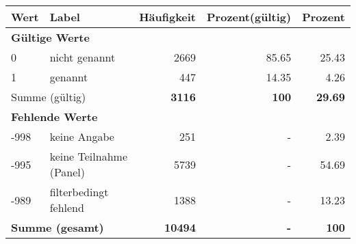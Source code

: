      \begin{longtable}{lXrrr}
     \toprule
     \textbf{Wert} & \textbf{Label} & \textbf{Häufigkeit} & \textbf{Prozent(gültig)} & \textbf{Prozent} \\
     \endhead
     \midrule
     \multicolumn{5}{l}{\textbf{Gültige Werte}}\\

     0 &
     \multicolumn{1}{X}{ nicht genannt   } &


       \num{2669} &
       \num[round-mode=places,round-precision=2]{85.65} &
         \num[round-mode=places,round-precision=2]{25.43} \\

     1 &
     \multicolumn{1}{X}{ genannt   } &


       \num{447} &
       \num[round-mode=places,round-precision=2]{14.35} &
         \num[round-mode=places,round-precision=2]{4.26} \\
     \midrule
     \multicolumn{2}{l}{Summe (gültig)} &
       \textbf{\num{3116}} &
     \textbf{\num{100}} &
       \textbf{\num[round-mode=places,round-precision=2]{29.69}} \\
     \multicolumn{5}{l}{\textbf{Fehlende Werte}}\\
       -998 &
       keine Angabe &
         \num{251} &
        - &
         \num[round-mode=places,round-precision=2]{2.39} \\
       -995 &
       keine Teilnahme (Panel) &
         \num{5739} &
        - &
         \num[round-mode=places,round-precision=2]{54.69} \\
       -989 &
       filterbedingt fehlend &
         \num{1388} &
        - &
         \num[round-mode=places,round-precision=2]{13.23} \\
     \midrule
     \multicolumn{2}{l}{\textbf{Summe (gesamt)}} &
          \textbf{\num{10494}} &
        \textbf{-} &
        \textbf{\num{100}} \\
     \bottomrule
     \end{longtable}
     
